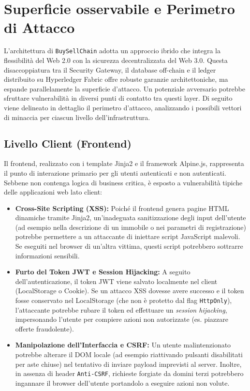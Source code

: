 \chapter{Superficie osservabile e Perimetro di Attacco}

L'architettura di \texttt{BuySellChain} adotta un approccio ibrido che integra la flessibilità del Web 2.0 con la sicurezza decentralizzata del Web 3.0. Questa disaccoppiatura tra il Security Gateway, il database off-chain e il ledger distribuito su Hyperledger Fabric offre robuste garanzie architettoniche, ma espande parallelamente la superficie d'attacco. Un potenziale avversario potrebbe sfruttare vulnerabilità in diversi punti di contatto tra questi layer. Di seguito viene delineato in dettaglio il perimetro d'attacco, analizzando i possibili vettori di minaccia per ciascun livello dell'infrastruttura.

\section{Livello Client (Frontend)}
Il frontend, realizzato con i template Jinja2 e il framework Alpine.js, rappresenta il punto di interazione primario per gli utenti autenticati e non autenticati. Sebbene non contenga logica di business critica, è esposto a vulnerabilità tipiche delle applicazioni web lato client:

\begin{itemize}
    \item \textbf{Cross-Site Scripting (XSS):} Poiché il frontend genera pagine HTML dinamiche tramite Jinja2, un'inadeguata sanitizzazione degli input dell'utente (ad esempio nella descrizione di un immobile o nei parametri di registrazione) potrebbe permettere a un attaccante di iniettare script JavaScript malevoli. Se eseguiti nel browser di un'altra vittima, questi script potrebbero sottrarre informazioni sensibili.
    \item \textbf{Furto del Token JWT e Session Hijacking:} A seguito dell'autenticazione, il token JWT viene salvato localmente nel client (LocalStorage o Cookie). Se un attacco XSS dovesse avere successo e il token fosse conservato nel LocalStorage (che non è protetto dal flag \texttt{HttpOnly}), l'attaccante potrebbe rubare il token ed effettuare un \textit{session hijacking}, impersonando l'utente per compiere azioni non autorizzate (es. piazzare offerte fraudolente).
    \item \textbf{Manipolazione dell'Interfaccia e CSRF:} Un utente malintenzionato potrebbe alterare il DOM locale (ad esempio riattivando pulsanti disabilitati per aste chiuse) nel tentativo di inviare payload imprevisti al server. Inoltre, in assenza di header \texttt{Anti-CSRF}, richieste forgiate da domini terzi potrebbero ingannare il browser dell'utente portandolo a eseguire azioni non volute.
\end{itemize}

